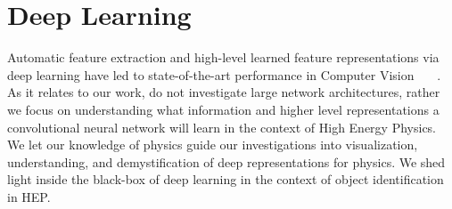 \section{Deep Learning} %
\label{sec:deep_learning}


Automatic feature extraction and high-level learned feature representations via deep learning have led to state-of-the-art performance in Computer Vision ~\cite{vggnet}~\cite{maxout:goodfellow}~\cite{dropout:and:LRN}. As it relates to our work, do not investigate large network architectures, rather we focus on  understanding what information and higher level representations a convolutional neural network will learn in the context of High Energy Physics. We let our knowledge of physics guide our investigations into visualization, understanding, and demystification of deep representations for physics. We shed light inside the black-box of deep learning in the context of object identification in HEP.


